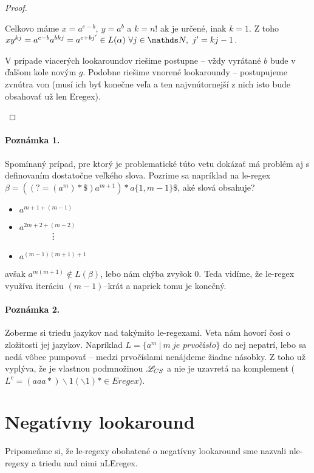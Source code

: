 \begin{proof}
\begin{enumerate}
Celkovo máme $x=a^{e-b},~y=a^b$ a $k = n!$ ak je určené, inak $k=1$. Z toho $xy^{kj} = a^{e-b}a^{bkj} = a^{e+bj'} \in L(\alpha) ~ \forall j \in \N, ~ j' = kj-1$. 

V prípade viacerých lookaroundov riešime postupne -- vždy vyrátané $b$ bude v ďalšom kole novým $g$. Podobne riešime vnorené lookaroundy -- postupujeme zvnútra von (musí ich byť konečne veľa a ten najvnútornejší z nich isto bude obsahovať už len Eregex).
\end{enumerate} 
\end{proof}

\paragraph{Poznámka 1.}
Spomínaný prípad, pre ktorý je problematické túto vetu dokázať má problém aj s definovaním dostatočne veľkého slova. Pozrime sa napríklad na le-regex $\beta = ((?=(a^m)*\mathdollar )a^{m+1})*a \lbrace 1,m-1 \rbrace \mathdollar$, aké slová obsahuje?
\begin{itemize}
\item $a^{m+1+(m-1)}$
\item $a^{2m+2+(m-2)}$ \\
	  ~~~~~~~\vdots
\item $a^{(m-1)(m+1)+1}$
\end{itemize}
avšak $a^{m(m+1)} \notin L(\beta )$, lebo nám chýba zvyšok $0$. Teda vidíme, že le-regex využíva iteráciu $(m-1)$--krát a napriek tomu je konečný.

\paragraph{Poznámka 2.}
Zoberme si triedu jazykov nad takýmito le-regexami. Veta nám hovorí čosi o zložitosti jej jazykov. Napríklad $L = \lbrace a^m ~|~ m~\textit{je~prvočíslo}\rbrace$ do nej nepatrí, lebo sa nedá vôbec pumpovať -- medzi prvočíslami nenájdeme žiadne násobky. Z toho už vyplýva, že je vlastnou podmnožinou $\mathscr{L}_{CS}$ a nie je uzavretá na komplement ($L^c = (aaa*)\backslash 1(\backslash1)* \in Eregex$).

\section{Negatívny lookaround}\label{chap:negla}

Pripomeňme si, že le-regexy obohatené o negatívny lookaround sme nazvali nle-regexy a triedu nad nimi nLEregex.


